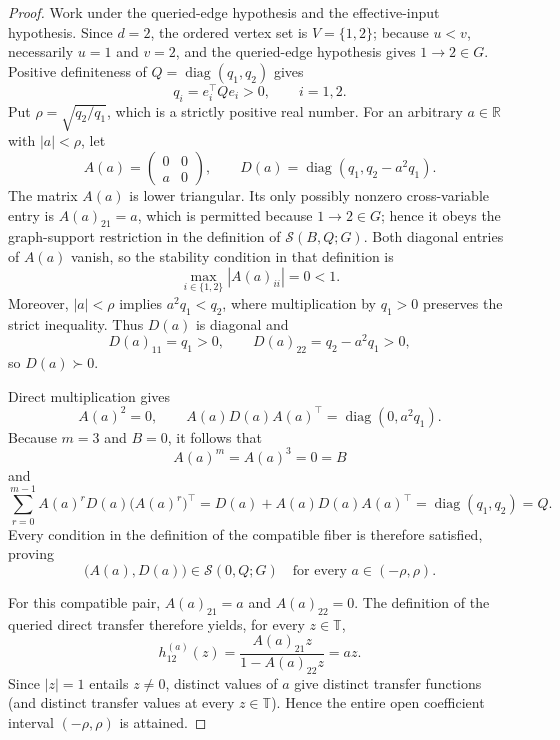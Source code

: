 \documentclass{article}
\begin{document}
\begin{proof}
Work under the queried-edge hypothesis and the effective-input hypothesis.  Since \(d=2\), the ordered vertex set is \(V=\{1,2\}\); because \(u<v\), necessarily \(u=1\) and \(v=2\), and the queried-edge hypothesis gives \(1\to2\in G\).  Positive definiteness of \(Q=\operatorname{diag}(q_1,q_2)\) gives
\[
q_i=e_i^{\top}Qe_i>0,\qquad i=1,2.
\]
Put \(\rho=\sqrt{q_2/q_1}\), which is a strictly positive real number.  For an arbitrary \(a\in\mathbb R\) with \(|a|<\rho\), let
\[
A(a)=\left(\begin{smallmatrix}0&0\\ a&0\end{smallmatrix}\right),
\qquad
D(a)=\operatorname{diag}(q_1,q_2-a^2q_1).
\]
The matrix \(A(a)\) is lower triangular.  Its only possibly nonzero cross-variable entry is \(A(a)_{21}=a\), which is permitted because \(1\to2\in G\); hence it obeys the graph-support restriction in the definition of \(\mathcal S(B,Q;G)\).  Both diagonal entries of \(A(a)\) vanish, so the stability condition in that definition is
\[
\max_{i\in\{1,2\}}|A(a)_{ii}|=0<1.
\]
Moreover, \(|a|<\rho\) implies \(a^2q_1<q_2\), where multiplication by \(q_1>0\) preserves the strict inequality.  Thus \(D(a)\) is diagonal and
\[
D(a)_{11}=q_1>0,
\qquad
D(a)_{22}=q_2-a^2q_1>0,
\]
so \(D(a)\succ0\).

Direct multiplication gives
\[
A(a)^2=0,
\qquad
A(a)D(a)A(a)^{\top}
=\operatorname{diag}(0,a^2q_1).
\]
Because \(m=3\) and \(B=0\), it follows that
\[
A(a)^m=A(a)^3=0=B
\]
and
\[
\sum_{r=0}^{m-1}A(a)^rD(a)\bigl(A(a)^r\bigr)^{\top}
=D(a)+A(a)D(a)A(a)^{\top}
=\operatorname{diag}(q_1,q_2)
=Q.
\]
Every condition in the definition of the compatible fiber is therefore satisfied, proving
\[
\bigl(A(a),D(a)\bigr)\in\mathcal S(0,Q;G)
\quad\text{for every }a\in(-\rho,\rho).
\]

For this compatible pair, \(A(a)_{21}=a\) and \(A(a)_{22}=0\).  The definition of the queried direct transfer therefore yields, for every \(z\in\mathbb T\),
\[
h_{12}^{(a)}(z)
=\frac{A(a)_{21}z}{1-A(a)_{22}z}
=az.
\]
Since \(|z|=1\) entails \(z\ne0\), distinct values of \(a\) give distinct transfer functions (and distinct transfer values at every \(z\in\mathbb T\)).  Hence the entire open coefficient interval \((-\rho,\rho)\) is attained.


\end{proof}
\end{document}
